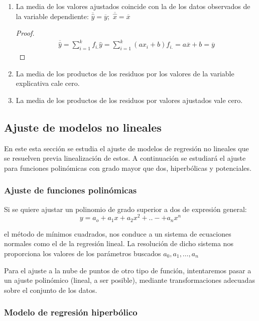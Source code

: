 \documentclass{article}
\theoremstyle{definition}
\begin{document}
\begin{enumerate}
\item La media de los valores ajustados coincide con la de los datos observados
de la variable dependiente: $\overline{\hat{y}} = \overline{y}; $
$\overline{\hat{x}} = \overline{x}$

\begin{proof} $ $\newline
\begin{align*}
\overline{\hat{y}} = \sum_{i=1}^k f_{i.} \hat{y} =
											\sum_{i=1}^k (ax_i +b)f_{i.} =
										 a\overline{x} +b = \overline{y}
\end{align*}
\end{proof}

\item La media de los productos de los residuos por los
valores de la variable explicativa cale cero. \item La media de los productos de
los residuos por valores ajustados vale cero.

\end{enumerate}

\subsection{Ajuste de modelos no lineales}

En este esta sección se estudia el ajuste de modelos de regresión no lineales que
se resuelven previa linealización de estos. A continuación se estudiará el
ajuste para funciones polinómicas con grado mayor que dos, hiperbólicas y
potenciales.

\subsubsection{Ajuste de funciones polinómicas}

Si se quiere ajustar un polinomio de grado superior a dos de expresión general: $$
y = a_o + a_1x +a_2x^2 + ..- + a_n x^n $$

el método de mínimos cuadrados, nos conduce a un sistema de ecuaciones normales
como el de la regresión lineal. La resolución de dicho sistema nos proporciona
los valores de los parámetros buscados $a_0, a_1, \ldots , a_n$

Para el ajuste a la nube de puntos de otro tipo de función, intentaremos pasar a
un ajuste polinómico (lineal, a ser posible), mediante transformaciones
adecuadas sobre el conjunto de los datos.

\subsubsection{Modelo de regresión hiperbólico}
\end{document}
